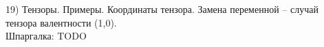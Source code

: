 19) Тензоры. Примеры. Координаты тензора. Замена переменной – случай тензора валентности (1,0).\\
Шпаргалка: TODO\\
